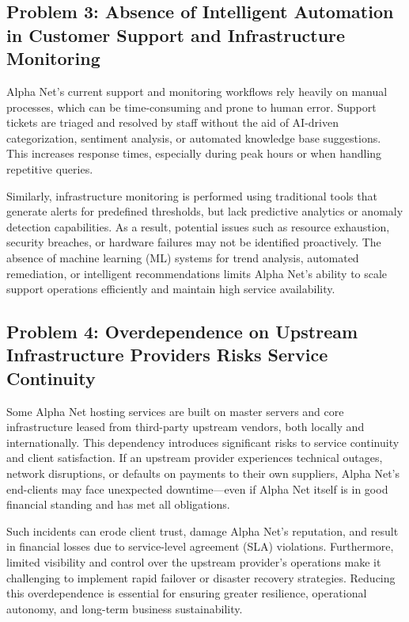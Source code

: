 \subsection{Problem 3: Absence of Intelligent Automation in Customer Support and Infrastructure Monitoring}

Alpha Net's current support and monitoring workflows rely heavily on manual processes, which can be time-consuming and prone to human error. Support tickets are triaged and resolved by staff without the aid of AI-driven categorization, sentiment analysis, or automated knowledge base suggestions. This increases response times, especially during peak hours or when handling repetitive queries.

Similarly, infrastructure monitoring is performed using traditional tools that generate alerts for predefined thresholds, but lack predictive analytics or anomaly detection capabilities. As a result, potential issues such as resource exhaustion, security breaches, or hardware failures may not be identified proactively. The absence of machine learning (ML) systems for trend analysis, automated remediation, or intelligent recommendations limits Alpha Net’s ability to scale support operations efficiently and maintain high service availability.

\subsection{Problem 4: Overdependence on Upstream Infrastructure Providers Risks Service Continuity}

Some Alpha Net hosting services are built on master servers and core infrastructure leased from third-party upstream vendors, both locally and internationally. This dependency introduces significant risks to service continuity and client satisfaction. If an upstream provider experiences technical outages, network disruptions, or defaults on payments to their own suppliers, Alpha Net’s end-clients may face unexpected downtime—even if Alpha Net itself is in good financial standing and has met all obligations.

Such incidents can erode client trust, damage Alpha Net’s reputation, and result in financial losses due to service-level agreement (SLA) violations. Furthermore, limited visibility and control over the upstream provider’s operations make it challenging to implement rapid failover or disaster recovery strategies. Reducing this overdependence is essential for ensuring greater resilience, operational autonomy, and long-term business sustainability.


